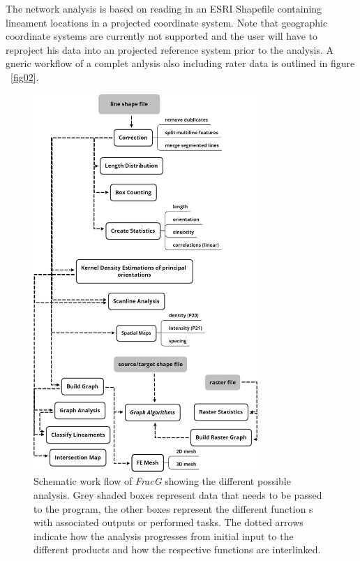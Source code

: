\documentclass[a4paper,fleqn]{cas-sc}
\begin{document}
The network analysis is based on reading in an ESRI Shapefile containing lineament locations in a projected coordinate system. Note that geographic coordinate systems are currently not supported and the user will have to reproject his data into an projected reference system prior to the analysis. A gneric workflow of a complet anlysis also including rater data is outlined in figure ~\ref{fig02}. 

\begin{figure}[h]
\centering
	\includegraphics[width=8.5cm]{fig01.jpg}
	\caption{Schematic work flow of \textit{FracG} showing the different possible analysis. Grey shaded boxes represent data that needs to be passed to the program, the other boxes represent the different function s with associated outputs or performed tasks. The dotted arrows indicate  how the analysis progresses from initial input to the different products and how the respective functions are interlinked.}
\label{fig01}
\end{figure}
\end{document}
